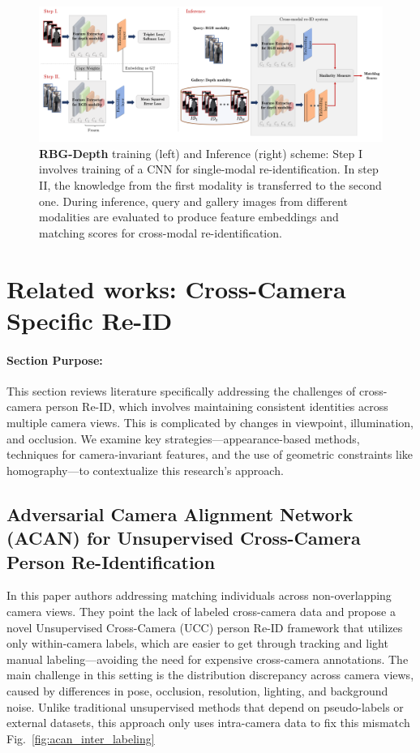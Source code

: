 \documentclass[12pt, a4paper]{article}
\begin{document}
 \begin{figure}[h]
    \centering
    \includegraphics[width=0.9\linewidth]{pictures/depth-scheme.pdf}
    \caption{\textbf{RBG-Depth} training (left) and Inference (right) scheme: Step I involves training of a CNN for single-modal re-identification. In step II, the knowledge from the first modality is transferred to the second one. During inference, query and gallery images from diﬀerent modalities are evaluated to produce feature embeddings and matching scores for cross-modal re-identification.}
    \label{fig:depth-scheme}
\end{figure}


\section{Related works: Cross-Camera Specific Re-ID}

\paragraph{Section Purpose:} 

This section reviews literature specifically addressing the challenges of cross-camera person Re-ID, which involves maintaining consistent identities across multiple camera views. This is complicated by changes in viewpoint, illumination, and occlusion. We examine key strategies—appearance-based methods, techniques for camera-invariant features, and the use of geometric constraints like homography—to contextualize this research's approach.

\subsection{Adversarial Camera Alignment Network (ACAN) for Unsupervised Cross-Camera Person Re-Identification \cite{ACAN}}


In this paper authors addressing matching individuals across non-overlapping camera views. They point the lack of labeled cross-camera data and propose a novel Unsupervised Cross-Camera (UCC) person Re-ID framework that utilizes only within-camera labels, which are easier to get through tracking and light manual labeling—avoiding the need for expensive cross-camera annotations. The main challenge in this setting is the distribution discrepancy across camera views, caused by differences in pose, occlusion, resolution, lighting, and background noise. Unlike traditional unsupervised methods that depend on pseudo-labels or external datasets, this approach only uses intra-camera data to fix this mismatch Fig.~\ref{fig:acan_inter_labeling}
\end{document}
